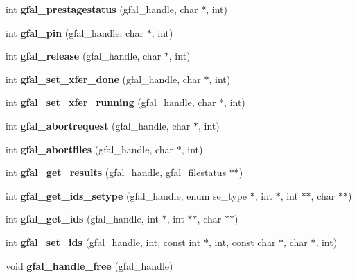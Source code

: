 \begin{CompactItemize}
\item 
int \textbf{gfal\_\-prestagestatus} (gfal\_\-handle, char $\ast$, int)\label{gfal__common_8h_ae17e3249e7ab47bfcbb4bbfb0e6da6c}

\item 
int \textbf{gfal\_\-pin} (gfal\_\-handle, char $\ast$, int)\label{gfal__common_8h_9764581af9643f6d3f014b2bc9d5c4ac}

\item 
int \textbf{gfal\_\-release} (gfal\_\-handle, char $\ast$, int)\label{gfal__common_8h_d67e1b55d16fbcc9c02e0ab44bbed7bd}

\item 
int \textbf{gfal\_\-set\_\-xfer\_\-done} (gfal\_\-handle, char $\ast$, int)\label{gfal__common_8h_0dd3f7181d48d5311146106ec2eaba8a}

\item 
int \textbf{gfal\_\-set\_\-xfer\_\-running} (gfal\_\-handle, char $\ast$, int)\label{gfal__common_8h_e907a676c77e646e5a878e1db1fdcd96}

\item 
int \textbf{gfal\_\-abortrequest} (gfal\_\-handle, char $\ast$, int)\label{gfal__common_8h_c38428bec7d99cd8e97f8c2cecb02c26}

\item 
int \textbf{gfal\_\-abortfiles} (gfal\_\-handle, char $\ast$, int)\label{gfal__common_8h_492b7ad68bbcc21f29a4f7de5787bd58}

\item 
int \textbf{gfal\_\-get\_\-results} (gfal\_\-handle, gfal\_\-filestatus $\ast$$\ast$)\label{gfal__common_8h_eae3f1d564f4e403597f5024c3d2d606}

\item 
int \textbf{gfal\_\-get\_\-ids\_\-setype} (gfal\_\-handle, enum se\_\-type $\ast$, int $\ast$, int $\ast$$\ast$, char $\ast$$\ast$)\label{gfal__common_8h_2bed7d372296a8d43282cea69ccb663e}

\item 
int \textbf{gfal\_\-get\_\-ids} (gfal\_\-handle, int $\ast$, int $\ast$$\ast$, char $\ast$$\ast$)\label{gfal__common_8h_72418d9d0374b8beca6fca284a8e5db2}

\item 
int \textbf{gfal\_\-set\_\-ids} (gfal\_\-handle, int, const int $\ast$, int, const char $\ast$, char $\ast$, int)\label{gfal__common_8h_5da8c01443270bf26cb6f60fe1457c53}

\item 
void \textbf{gfal\_\-handle\_\-free} (gfal\_\-handle)\label{gfal__common_8h_a21bc6b4163400d28590637b474a1b05}


\end{CompactItemize}
